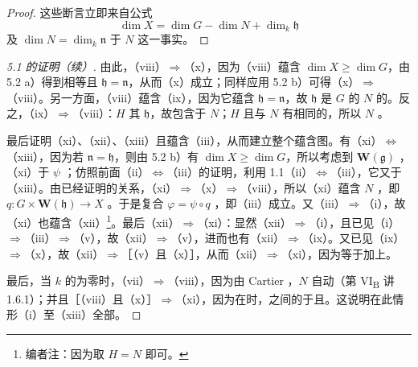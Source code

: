 \begin{proof}
这些断言立即来自公式
\[\dim X=\dim G-\dim N+\dim_k\mathfrak h\]
及 $\dim N=\dim_k\mathfrak n$ 于 $N$ 这一事实。
\end{proof}
\begin{proof}[ 5.1 的证明（续）]
由此，（viii）$\Rightarrow$（x），因为（viii）蕴含 $\dim X\geq\dim G$，由 5.2 a）得到相等且 $\mathfrak h=\mathfrak n$，从而（x）成立；同样应用 5.2 b）可得（x）$\Rightarrow$（viii）。另一方面，（viii）蕴含（ix），因为它蕴含 $\mathfrak h=\mathfrak n$，故 $\mathfrak h$ 是 $G$ 的 $N$ 的。反之，（ix）$\Rightarrow$（viii）：$H$ 其 $\mathfrak h$，故包含于 $N$；$H$ 且与 $N$ 有相同的，所以 $N$ 。

最后证明（xi）、（xii）、（xiii）且蕴含（iii），从而建立整个蕴含图。有（xi）$\Leftrightarrow$（xiii），因为若 $\mathfrak n=\mathfrak h$，则由 5.2 b）有 $\dim X\geq\dim G$，所以考虑到 $\mathbf W(\mathfrak g)$ ，（xi）于 $\psi$ ；仿照前面（ii）$\Leftrightarrow$（iii）的证明，利用 1.1（ii）$\Leftrightarrow$（iii），它又于（xiii）。由已经证明的关系，（xi）$\Rightarrow$（x）$\Rightarrow$（viii），所以（xi）蕴含 $N$ ，即 $q:G\times\mathbf W(\mathfrak h)\to X$ 。于是复合 $\varphi=\psi\circ q$ ，即（iii）成立。又（iii）$\Rightarrow$（i），故（xi）也蕴含（xii）\footnote{编者注：因为取 $H=N$ 即可。}。最后（xii）$\Rightarrow$（xi）：显然（xii）$\Rightarrow$（i），且已见（i）$\Rightarrow$（iii）$\Rightarrow$（v），故（xii）$\Rightarrow$（v），进而也有（xii）$\Rightarrow$（ix）。又已见（ix）$\Rightarrow$（x），故（xii）$\Rightarrow$［（v）且（x）］，从而（xii）$\Rightarrow$（xi），因为等于加上。

最后，当 $k$ 的为零时，（vii）$\Rightarrow$（viii），因为由 Cartier ，$N$ 自动（第 VI\textsubscript{B} 讲 1.6.1）；并且［（viii）且（x）］$\Rightarrow$（xi），因为在时，之间的于且。这说明在此情形（i）至（xiii）全部。
\end{proof}
